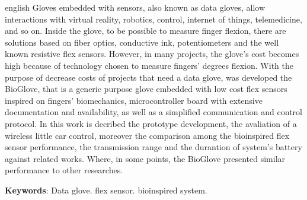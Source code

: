 \documentclass[
	12pt,				%
	openright,			%
	oneside,			%
	a4paper,			%
	english,			%
	brazil				%
	]{abntex2}
\begin{document}
\begin{resumo}[Abstract]
 \begin{otherlanguage*}{english}
\hspace{1.5cm}Gloves embedded with sensors, also known as data gloves, allow interactions with virtual reality, robotics, control, internet of things, telemedicine, and so on. Inside the glove, to be possible to measure finger flexion, there are solutions based on fiber optics, conductive ink, potentiometers and the well known resistive flex sensors. However, in many projects, the glove's cost becomes high because of technology chosen to measure fingers' degrees flexion. With the purpose of decrease costs of projects that need a data glove, was developed the BioGlove, that is a generic purpose glove embedded with low cost flex sensors inspired on fingers' biomechanics, microcontroller board with extensive documentation and availability, as well as a simplified communication and control protocol. In this work is decribed the prototype development, the avaliation of a wireless little car control, moreover the comparison among the bioinspired flex sensor performance, the transmission range and the durantion of system's battery against related works. Where, in some points, the BioGlove presented similar performance to other researches.



   \vspace{\onelineskip}
 
   \noindent 
   \textbf{Keywords}: Data glove. flex sensor. bioinspired system.
 \end{otherlanguage*}
\end{resumo}


\listoffigures*
\cleardoublepage

\listoftables*
\cleardoublepage
\end{document}
